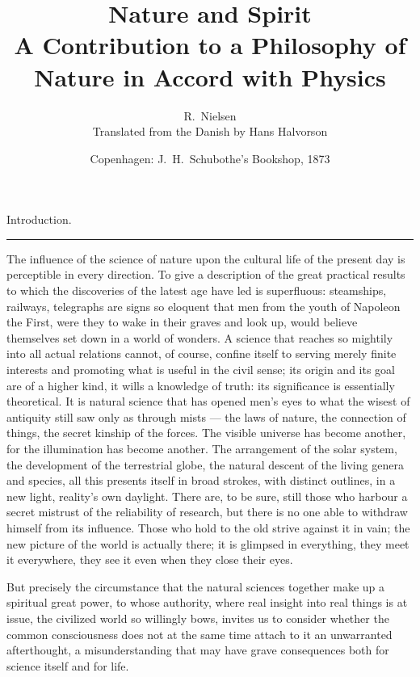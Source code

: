 \documentclass[12pt,a4paper]{book}
\title{Nature and Spirit\\[0.4em]
  \large A Contribution to a Philosophy of Nature in Accord with Physics}
\author{R.\ Nielsen\\[4pt]
  \small Translated from the Danish by Hans Halvorson}
\date{Copenhagen: J.\ H.\ Schubothe's Bookshop, 1873}
\newcommand{\streg}{\begin{center}\rule{2cm}{0.4pt}\end{center}}
\begin{document}
\maketitle
\tableofcontents

%

{\centering\large Introduction.\par}

\streg  %

The influence of the science of nature upon the cultural life of the present
day is perceptible in every direction. To give a description of the great
practical results to which the discoveries of the latest age have led is
superfluous: steamships, railways, telegraphs are signs so eloquent that men
from the youth of Napoleon the First, were they to wake in their graves and
look up, would believe themselves set down in a world of wonders. A science
that reaches so mightily into all actual relations cannot, of course, confine
itself to serving merely finite interests and promoting what is useful in the
civil sense; its origin and its goal are of a higher kind, it wills a knowledge
of truth: its significance is essentially theoretical. It is natural science
that has opened men's eyes to what the wisest of antiquity still saw only as
through mists --- the laws of nature, the connection of things, the secret
kinship of the forces. The visible universe has become another, for the
illumination has become another. The arrangement of the solar system, the
development of the terrestrial globe, the natural descent of the living genera
and species, all this presents itself in broad strokes, with distinct outlines,
in a new light, reality's own daylight. There are, to be sure, still those who
harbour a secret mistrust of the reliability of research, but there is no one
able to withdraw himself from its influence. Those who hold to the old strive
against it in vain; the new picture of the world is actually there; it is
glimpsed in everything, they meet it everywhere, they see it even when they
close their eyes.

But precisely the circumstance that the natural sciences together make up a
spiritual great power, to whose authority, where
real insight into real things is at issue, the civilized world so willingly
bows, invites us to consider whether the common consciousness does not at the
same time attach to it an unwarranted afterthought, a misunderstanding that may
have grave consequences both for science itself and for life.
\end{document}
